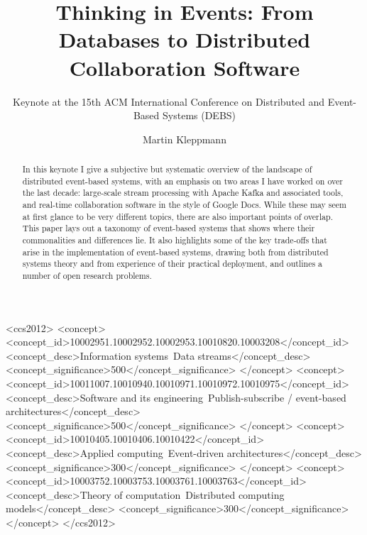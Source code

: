 \documentclass[sigconf]{acmart}
\begin{document}
\title{Thinking in Events: From Databases to Distributed Collaboration Software}
\subtitle{Keynote at the 15th ACM International Conference on Distributed and Event-Based Systems (DEBS)}

\author{Martin Kleppmann}

\begin{abstract}
In this keynote I give a subjective but systematic overview of the landscape of distributed event-based systems, with an emphasis on two areas I have worked on over the last decade: large-scale stream processing with Apache Kafka and associated tools, and real-time collaboration software in the style of Google Docs.
While these may seem at first glance to be very different topics, there are also important points of overlap.
This paper lays out a taxonomy of event-based systems that shows where their commonalities and differences lie.
It also highlights some of the key trade-offs that arise in the implementation of event-based systems, drawing both from distributed systems theory and from experience of their practical deployment, and outlines a number of open research problems.
\end{abstract}

\begin{CCSXML}
<ccs2012>
  <concept>
    <concept_id>10002951.10002952.10002953.10010820.10003208</concept_id>
    <concept_desc>Information systems~Data streams</concept_desc>
    <concept_significance>500</concept_significance>
  </concept>
  <concept>
    <concept_id>10011007.10010940.10010971.10010972.10010975</concept_id>
    <concept_desc>Software and its engineering~Publish-subscribe / event-based architectures</concept_desc>
    <concept_significance>500</concept_significance>
  </concept>
  <concept>
    <concept_id>10010405.10010406.10010422</concept_id>
    <concept_desc>Applied computing~Event-driven architectures</concept_desc>
    <concept_significance>300</concept_significance>
  </concept>
  <concept>
    <concept_id>10003752.10003753.10003761.10003763</concept_id>
    <concept_desc>Theory of computation~Distributed computing models</concept_desc>
    <concept_significance>300</concept_significance>
  </concept>
</ccs2012>
\end{CCSXML}

\end{document}
